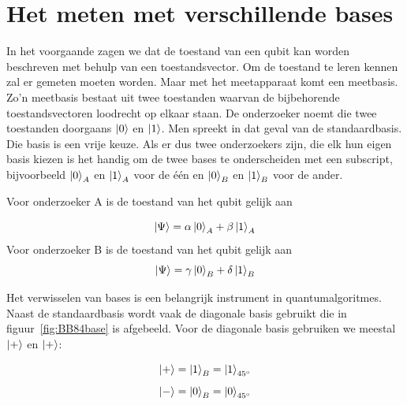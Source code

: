 \documentclass[../../main.tex]{subfiles}
\begin{document}
\section{Het meten met verschillende bases}\label{sec:verschillendebases}
In het voorgaande zagen we dat de toestand van een qubit kan worden beschreven met behulp van een toestandsvector. Om de toestand te leren kennen zal er gemeten moeten worden. Maar met het meetapparaat komt een meetbasis.  Zo'n meetbasis bestaat uit twee toestanden waarvan de bijbehorende toestandsvectoren loodrecht op elkaar staan. De onderzoeker noemt die twee toestanden doorgaans $\ket{0}$ en $\ket{1}$.  Men spreekt in dat geval van de standaardbasis. Die basis is een vrije keuze. Als er dus twee onderzoekers zijn, die elk hun eigen basis kiezen is het handig om de twee bases te onderscheiden met een subscript, bijvoorbeeld $\ket{0}_A$ en $\ket{1}_A$  voor de \'e\'en en $\ket{0}_B$ en $\ket{1}_B$ voor de ander.

Voor onderzoeker A is de toestand van het qubit gelijk aan 

\[\ket{\Psi} = \alpha \ket{0}_A +\beta\ket{1}_A\]
Voor onderzoeker B is de toestand van het qubit  gelijk aan 
\[\ket{\Psi} = \gamma \ket{0}_B +\delta\ket{1}_B\]

Het verwisselen van bases is een belangrijk instrument in quantumalgoritmes. Naast de standaardbasis wordt vaak de diagonale basis gebruikt die in figuur~\ref{fig:BB84base} is afgebeeld. Voor de diagonale basis gebruiken we meestal $\ket{+}$ en $\ket{+}$:

\[\ket{+} = \ket{1}_B = \ket{1}_{45\si{\degree}}\]
\[\ket{-} = \ket{0}_B = \ket{0}_{45\si{\degree}}\]
\end{document}
